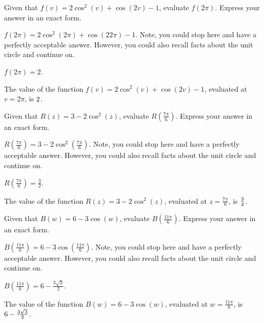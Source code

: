 \begin{shuffle}
\begin{exercise}
Given that $f(v)=2 \cos ^2(v)+\cos (2 v)-1$, evaluate $f\left(2 \pi\right)$. Express your answer in an exact form.
\begin{solution}
\begin{hint}
$f\left(2 \pi\right)=2 \cos ^2\left(2 \pi\right)+\cos \left(2 2 \pi\right)-1$. Note, you could stop here and have a perfectly acceptable answer. However, you could also recall facts about the unit circle and continue on. 
\end{hint}
\begin{hint}
$f\left(2 \pi\right)=2$.
\end{hint}
The value of the function $f(v)=2 \cos ^2(v)+\cos (2 v)-1$, evaluated at $v=2 \pi$, is ${2}$.
\end{solution}
\end{exercise}

\begin{exercise}
Given that $R(z)=3-2 \cos ^2(z)$, evaluate $R\left(\frac{7 \pi }{6}\right)$. Express your answer in an exact form.
\begin{solution}
\begin{hint}
$R\left(\frac{7 \pi }{6}\right)=3-2 \cos ^2\left(\frac{7 \pi }{6}\right)$. Note, you could stop here and have a perfectly acceptable answer. However, you could also recall facts about the unit circle and continue on. 
\end{hint}
\begin{hint}
$R\left(\frac{7 \pi }{6}\right)=\frac{3}{2}$.
\end{hint}
The value of the function $R(z)=3-2 \cos ^2(z)$, evaluated at $z=\frac{7 \pi }{6}$, is ${\frac{3}{2}}$.
\end{solution}
\end{exercise}

\begin{exercise}
Given that $B(w)=6-3 \cos (w)$, evaluate $B\left(\frac{11 \pi }{6}\right)$. Express your answer in an exact form.
\begin{solution}
\begin{hint}
$B\left(\frac{11 \pi }{6}\right)=6-3 \cos \left(\frac{11 \pi }{6}\right)$. Note, you could stop here and have a perfectly acceptable answer. However, you could also recall facts about the unit circle and continue on. 
\end{hint}
\begin{hint}
$B\left(\frac{11 \pi }{6}\right)=6-\frac{3 \sqrt{3}}{2}$.
\end{hint}
The value of the function $B(w)=6-3 \cos (w)$, evaluated at $w=\frac{11 \pi }{6}$, is ${6-\frac{3 \sqrt{3}}{2}}$.
\end{solution}
\end{exercise}


\end{shuffle}
